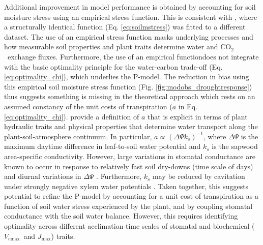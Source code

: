 \documentclass{myreport}
\newcommand{\coo}{CO$_2$}
\newcommand{\vcmax}{$V_{\text{cmax}}$}
\newcommand{\jmax}{$J_{\text{max}}$}
\begin{document}
Additional improvement in model performance is obtained by accounting for soil moisture stress using an empirical stress function. This is consistent with  \cite{stocker19natgeo}, where a structurally identical function (Eq. \ref{eq:soilmstress}) was fitted to a different dataset. The use of an empirical stress function masks underlying processes and how measurable soil properties and plant traits determine water and \coo\ exchange fluxes. Furthermore, the use of an empirical functiondoes not integrate with the basic optimality principle for the water-carbon trade-off (Eq. \ref{eq:optimality_chi}), which underlies the P-model. The reduction in bias using this empirical soil moisture stress function (Fig. \ref{fig:modobs_droughtresponse}) thus suggests something is missing in the theoretical approach which rests on an assumed constancy of the unit costs of transpiration ($a$ in Eq. \ref{eq:optimality_chi}). \cite{prentice14ecollett} provide a definition of $a$ that is explicit in terms of plant hydraulic traits and physical properties that determine water transport along the plant-soil-atmosphere continuum. In particular, $a \propto ( \Delta \Psi k_s )^{-1}$, where $\Delta \Psi$ is the maximum daytime difference in leaf-to-soil water potential and $k_s$ is the sapwood area-specific conductivity. However, large variations in stomatal conductance are known to occur in response to relatively fast soil dry-downs (time scale of days) and diurnal variations in $\Delta \Psi$ \citep{keenan10agrformet, egea11, stocker18newphyt}. Furthermore, $k_s$ may be reduced by cavitation under strongly negative xylem water potentials \citep{sperry15, mencuccini19newphyt}. Taken together, this suggests potential to refine the P-model by accounting for a unit cost of transpiration as a function of soil water stress experienced by the plant, and by coupling stomatal conductance with the soil water balance. However, this requires identifying optimality across different acclimation time scales of stomatal and biochemical (\vcmax\ and \jmax ) traits.
\end{document}
